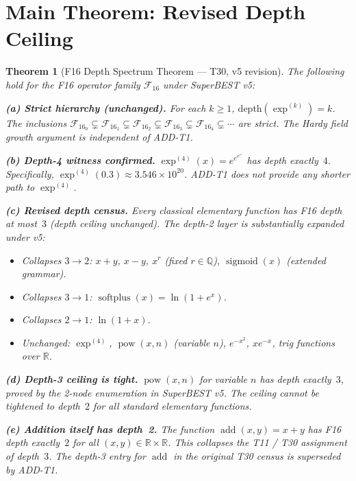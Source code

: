 \documentclass[12pt,a4paper]{article}
\newtheorem{theorem}{Theorem}[section]
\theoremstyle{definition}
\theoremstyle{remark}
\newcommand{\addop}{\operatorname{add}}
\newcommand{\powop}{\operatorname{pow}}
\newcommand{\sigmoid}{\operatorname{sigmoid}}
\newcommand{\softplus}{\operatorname{softplus}}
\newcommand{\F}{\mathcal{F}_{16}}
\newcommand{\R}{\mathbb{R}}
\newcommand{\Q}{\mathbb{Q}}
\begin{document}
\section{Main Theorem: Revised Depth Ceiling}
\label{sec:maintheorem}

\begin{theorem}[F16 Depth Spectrum Theorem — T30, v5 revision]
\label{thm:T30v5}
The following hold for the F16 operator family $\F$ under SuperBEST v5:

\medskip
\noindent\textbf{(a) Strict hierarchy (unchanged).}
For each $k\geq 1$, $\mathrm{depth}(\exp^{(k)})=k$.  The inclusions
$\F_0\subsetneq\F_1\subsetneq\F_2\subsetneq\F_3\subsetneq\F_4\subsetneq\cdots$
are strict.  The Hardy field growth argument is independent of ADD-T1.

\medskip
\noindent\textbf{(b) Depth-4 witness confirmed.}
$\exp^{(4)}(x)=e^{e^{e^{e^x}}}$ has depth exactly~$4$.
Specifically, $\exp^{(4)}(0.3)\approx 3.546\times 10^{20}$.
ADD-T1 does not provide any shorter path to $\exp^{(4)}$.

\medskip
\noindent\textbf{(c) Revised depth census.}
Every classical elementary function has F16 depth at most~$3$ (depth ceiling
unchanged).  The depth-2 layer is substantially expanded under v5:

\begin{itemize}
  \item \emph{Collapses $3\to 2$:} $x+y$, $x-y$, $x^r$ (fixed $r\in\Q$),
        $\sigmoid(x)$ (extended grammar).
  \item \emph{Collapses $3\to 1$:} $\softplus(x)=\ln(1+e^x)$.
  \item \emph{Collapses $2\to 1$:} $\ln(1+x)$.
  \item \emph{Unchanged:} $\exp^{(4)}$, $\powop(x,n)$ (variable $n$),
        $e^{-x^2}$, $xe^{-x}$, trig functions over $\R$.
\end{itemize}

\medskip
\noindent\textbf{(d) Depth-3 ceiling is tight.}
$\powop(x,n)$ for variable $n$ has depth exactly~$3$, proved by the 2-node
enumeration in SuperBEST v5.  The ceiling cannot be tightened to depth~$2$
for all standard elementary functions.

\medskip
\noindent\textbf{(e) Addition itself has depth~2.}
The function $\addop(x,y) = x+y$ has F16 depth exactly~$2$ for all
$(x,y)\in\R\times\R$.  This collapses the T11 / T30 assignment of depth~$3$.
The depth-3 entry for $\addop$ in the original T30 census is superseded by
ADD-T1.
\end{theorem}
\end{document}
